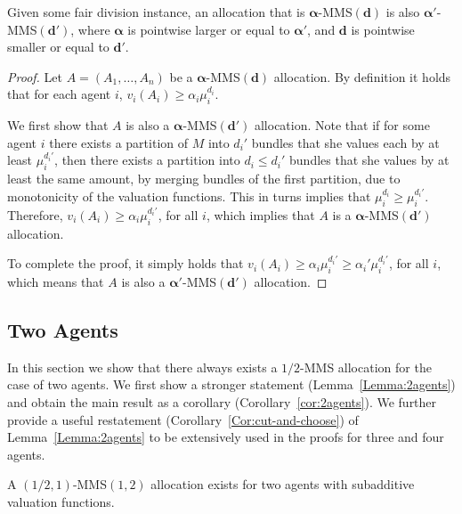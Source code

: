 \begin{observation}
\label{obs:simpleReduction}
    Given some fair division instance, an allocation that is $\boldsymbol{\alpha}$-MMS$(\mathbf{d})$ is also $\boldsymbol{\alpha}'$-MMS$(\mathbf{d}')$, where $\boldsymbol{\alpha}$ is pointwise larger or equal to $\boldsymbol{\alpha}'$, and $\mathbf{d}$ is pointwise smaller or equal to $\mathbf{d}'$.
\end{observation}
\begin{proof}
    Let $A=(A_1,\ldots, A_n)$ be a $\boldsymbol{\alpha}$-MMS$(\mathbf{d})$ allocation. By definition it holds that for each agent $i$, $v_i(A_i)\geq \alpha_i \mu_i^{d_i}$. 
    
    We first show that $A$ is also a $\boldsymbol{\alpha}$-MMS$(\mathbf{d}')$ allocation.  
    Note that if for some agent $i$ there exists a partition of $M$ into $d_i'$ bundles that she values each by at least $\mu_i^{d_i'}$, then there exists a partition into $d_i\le d_i'$ bundles that she values by at least the same amount, by merging bundles of the first partition, due to monotonicity of the valuation functions. This in turns implies that $\mu_i^{d_i}\geq \mu_i^{d_i'}$. Therefore, $v_i(A_i)\geq \alpha_i \mu_i^{d_i'}$, for all $i$, which implies that $A$ is a $\boldsymbol{\alpha}$-MMS$(\mathbf{d}')$ allocation. 
    
    To complete the proof, it simply holds that $v_i(A_i)\geq \alpha_i \mu_i^{d_i'}\ge \alpha_i' \mu_i^{d_i'}$, for all $i$, which means that $A$ is also a $\boldsymbol{\alpha}'$-MMS$(\mathbf{d}')$ allocation. 
\end{proof}


\subsection{Two Agents}
\label{sec:2Subadd}
In this section we show that there always exists a $1/2$-MMS allocation for the case of two agents. We first show a stronger statement (Lemma~\ref{Lemma:2agents}) and obtain the main result as a corollary (Corollary~\ref{cor:2agents}). We further provide a useful restatement (Corollary~\ref{Cor:cut-and-choose}) of Lemma~\ref{Lemma:2agents} to be extensively used in the proofs for three and four agents.

\begin{lemma}
\label{Lemma:2agents}
    A $(1/2,1)$-MMS$(1,2)$ allocation exists for two agents with subadditive valuation functions. 
\end{lemma}


